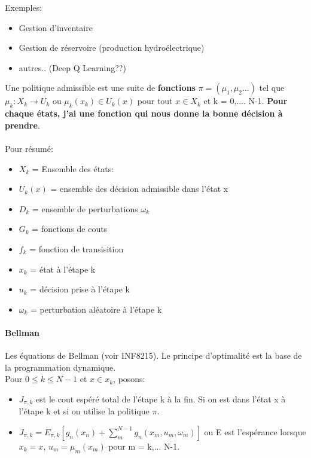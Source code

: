 \documentclass[oneside]{book}
\begin{document}
Exemples:
\begin{itemize}
\item Gestion d'inventaire
\item Gestion de réservoire (production hydroélectrique)
\item autres.. (Deep Q Learning??)
\end{itemize}  

Une politique admissible est une suite de \textbf{fonctions} $  \pi = (\mu_1, \mu_2...)$ tel que $\mu_k : X_k \rightarrow U_k$ ou $\mu_k(x_k) \in U_k(x)$ pour tout $x \in X_k$ et k = 0,.... N-1. \textbf{Pour chaque états, j'ai une fonction qui nous donne la bonne décision à prendre}.\\
 \\
 
 
Pour résumé:
\begin{itemize}
\item $X_k$ = Ensemble des états:
\item $U_k(x)$ = ensemble des décision admissible dans l'état x
\item $D_k$ = ensemble de perturbations $\omega_k$
\item $G_k$ = fonctions de couts
\item $f_k$ = fonction de transisition
\item $x_k$ = état à l'étape k
\item $u_k$ = décision prise à l'étape k
\item $\omega_k$ = perturbation aléatoire à l'étape k
\end{itemize}

\paragraph{Bellman}
Les équations de Bellman (voir INF8215). Le principe d'optimalité est la base de la programmation dynamique.\\

Pour $0\leq k \leq N-1$ et $x \in x_k$, posons:
\begin{itemize}
\item[] $J_{\pi, k}$ est le cout espéré total de l'étape k à la fin. Si on est dans l'état x à l'étape k et si on utilise la politique $\pi$.
\item[] $J_{\pi, k} = E_{\pi,k} [g_n(x_n) + \sum\limits_m^{N-1}g_n(x_m,u_m,\omega_m)]$ ou E est l'espérance lorsque $x_k = x$, $u_m = \mu_m(x_m)$ pour m = k,... N-1.
\end{itemize}
\end{document}
